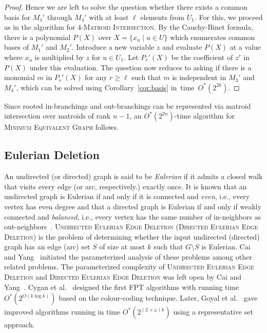 \documentclass[10pt,a4paper]{article}
\begin{document}
\begin{proof}
  Hence we are left to solve the question whether there exists
  a common basis for $M_1'$ through $M_4'$ with at least $\ell$
  elements from $U_1$. For this, we proceed as in the algorithm for
  \textsc{4-Matroid Intersection}. By the Cauchy-Binet formula,
  there is a polynomial $P(X)$ over $X=\{x_u \mid u \in U\}$
  which enumerates common bases of $M_1'$ and $M_2'$.
  Introduce a new variable $z$ and 
  evaluate $P(X)$ at a value where $x_u$ is multiplied by $z$ for $u \in U_1$. 
  Let $P_r'(X)$ be the coefficient of $z^r$ in $P(X)$ under this evaluation. 
  The question now reduces to asking if there is a monomial $m$ in
  $P_r'(X)$ for any $r \geq \ell$ such that $m$ is independent in
  $M_3'$ and $M_4'$, which can be solved using Corollary~\ref{cor:basis}
  in~time~$O^*(2^{2k})$. 
\end{proof}

Since rooted in-branchings and out-branchings can be represented via matroid intersection over matroids of rank $n-1$, an $O^*(2^{2n})$-time algorithm for \textsc{Minimum Equivalent Graph} follows.

\subsection{Eulerian Deletion}

An undirected (or directed) graph is said to be \emph{Eulerian} if it admits a closed walk that visits every edge (or arc, respectively.) exactly once.
It is known that an undirected graph is Eulerian if and only if it is connected and \emph{even}, i.e., every vertex has even degree and that a directed graph is Eulerian if and only if weakly connected and \emph{balanced}, i.e., every vertex has the same number of in-neighbors as out-neighbors~\cite{book-digraphs}.
\textsc{Undirected Eulerian Edge Deletion} (\textsc{Directed Eulerian Edge Deletion}) is the problem of determining whether the input undirected (directed) graph has an edge (arc) set $S$ of size at most $k$ such that $G \setminus S$ is Eulerian.
Cai and Yang~\cite{CaiY11} initiated the parameterized analysis of these problems among other related problems.
The parameterized complexity of \textsc{Undirected Eulerian Edge Deletion} and \textsc{Directed Eulerian Edge Deletion} was left open by Cai and Yang~\cite{CaiY11}.
Cygan et al.~\cite{CyganMPPS14euler} designed the first FPT algorithms with running time $O^*(2^{O(k \log k)})$ based on the colour-coding technique.
Later, Goyal et al.~\cite{GoyalMPPS18even} gave improved algorithms running in time $O^*(2^{(2 + \omega)k})$ using a representative set approach.
\end{document}
